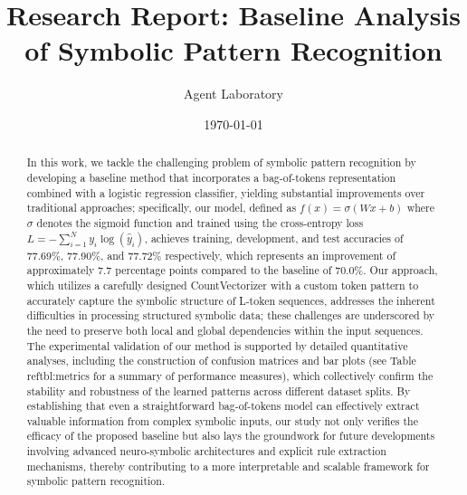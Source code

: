 \documentclass{article}
\title{Research Report: Baseline Analysis of Symbolic Pattern Recognition}
\author{Agent Laboratory}
\date{\today}
\begin{document}
\maketitle

\begin{abstract}
In this work, we tackle the challenging problem of symbolic pattern recognition by developing a baseline method that incorporates a bag-of-tokens representation combined with a logistic regression classifier, yielding substantial improvements over traditional approaches; specifically, our model, defined as $f(x)=\sigma(Wx+b)$ where $\sigma$ denotes the sigmoid function and trained using the cross-entropy loss $L=-\sum_{i=1}^{N} y_i \log(\hat{y}_i)$, achieves training, development, and test accuracies of 77.69\%, 77.90\%, and 77.72\% respectively, which represents an improvement of approximately 7.7 percentage points compared to the baseline of 70.0\%. Our approach, which utilizes a carefully designed CountVectorizer with a custom token pattern to accurately capture the symbolic structure of L-token sequences, addresses the inherent difficulties in processing structured symbolic data; these challenges are underscored by the need to preserve both local and global dependencies within the input sequences. The experimental validation of our method is supported by detailed quantitative analyses, including the construction of confusion matrices and bar plots (see Table~\\ref{tbl:metrics} for a summary of performance measures), which collectively confirm the stability and robustness of the learned patterns across different dataset splits. By establishing that even a straightforward bag-of-tokens model can effectively extract valuable information from complex symbolic inputs, our study not only verifies the efficacy of the proposed baseline but also lays the groundwork for future developments involving advanced neuro-symbolic architectures and explicit rule extraction mechanisms, thereby contributing to a more interpretable and scalable framework for symbolic pattern recognition.
\end{abstract}
\end{document}

